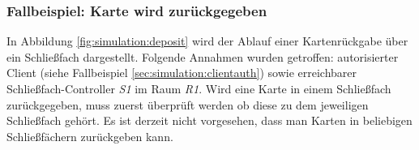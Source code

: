 \subsubsection{Fallbeispiel: Karte wird zurückgegeben}
In Abbildung \ref{fig:simulation:deposit} wird der Ablauf einer Kartenrückgabe über ein Schließfach dargestellt. Folgende Annahmen wurden getroffen: autorisierter Client (siehe Fallbeispiel \ref{sec:simulation:clientauth}) sowie erreichbarer Schließfach-Controller \textit{S1} im Raum \textit{R1}. Wird eine Karte in einem Schließfach zurückgegeben, muss zuerst überprüft werden ob diese zu dem jeweiligen Schließfach gehört. Es ist derzeit nicht vorgesehen, dass man Karten in beliebigen Schließfächern zurückgeben kann. 
\vspace*{\fill}
\begin{center}
    \label{fig:simulation:deposit}
\end{center}
\vspace*{\fill}

\newpage

